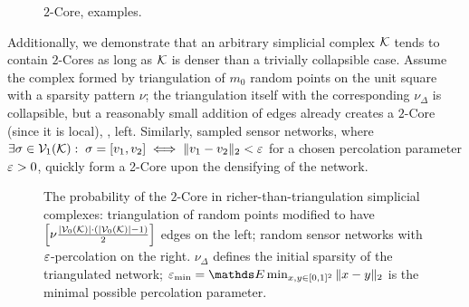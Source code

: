 \begin{figure}[htbp]
      \centering
      \caption{ \(2\)-Core, examples. \label{fig:2-core} }
\end{figure}

Additionally, we demonstrate that an arbitrary simplicial complex \(\mathcal{K}\) tends to contain \(2\)-Cores as long as \( \mathcal{K} \) is denser than a trivially collapsible case. Assume the complex formed by triangulation of \( m_0 \) random points on the unit square with a sparsity pattern \( \nu \); the triangulation itself with the corresponding \( \nu_\Delta \) is collapsible, but a reasonably small addition of edges already creates a \(2\)-Core (since it is local), , left. Similarly, sampled sensor networks, where \( \exists \sigma \in \mathcal{V}_{1}(\mathcal{K}): \; \sigma = [v_1, v_2] \iff \| v_1 - v_2 \|_2 < \varepsilon \) for a chosen percolation parameter \( \varepsilon > 0 \), quickly form a 2-Core upon the densifying of the network.

\begin{figure}[htbp]
      \centering
      \scalebox{0.4}{
            
      }%
      \scalebox{0.4}{
            
      }
      \caption{ The probability of the \( 2 \)-Core in richer-than-triangulation simplicial complexes: triangulation of random points modified to have \( \left[ \nu \frac{ | \mathcal{V}_{0}(\mathcal{K}) | \cdot ( | \mathcal{V}_{0}(\mathcal{K}) | - 1 ) }{2} \right] \) edges on the left; random sensor networks with \( \varepsilon \)-percolation on the right. \( \nu_\Delta \) defines the initial sparsity of the triangulated network; \(\eps_{\min} = \ds E \min_{x, y \in [0, 1]^2} \| x - y\|_2 \) is the minimal possible percolation parameter. \label{fig:core_prob} }
\end{figure}

